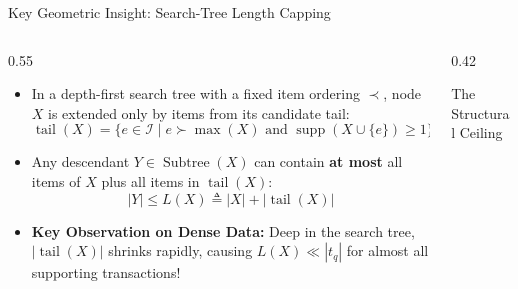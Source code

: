 \documentclass[aspectratio=169,10pt]{beamer}
\newcommand{\supp}{\operatorname{supp}}
\newcommand{\tail}{\operatorname{tail}}
\newcommand{\Subtree}{\operatorname{Subtree}}
\begin{document}
\begin{frame}[fragile]{Key Geometric Insight: Search-Tree Length Capping}
  \begin{columns}[T]
    \begin{column}{0.55\textwidth}
      \begin{itemize}
        \item In a depth-first search tree with a fixed item ordering $\prec$, node $X$ is extended only by items from its candidate tail:
        $$\tail(X) = \{e \in \mathcal{I} \mid e \succ \max(X) \text{ and } \supp(X \cup \{e\}) \ge 1\}$$
        \item Any descendant $Y \in \Subtree(X)$ can contain \textbf{at most} all items of $X$ plus all items in $\tail(X)$:
        $$|Y| \le L(X) \triangleq |X| + |\tail(X)|$$
        \item \textbf{Key Observation on Dense Data:}
        Deep in the search tree, $|\tail(X)|$ shrinks rapidly, causing $L(X) \ll |t_q|$ for almost all supporting transactions!
      \end{itemize}
    \end{column}
    \begin{column}{0.42\textwidth}
      \begin{block}{The Structural Ceiling}
        \centering
        \vspace{0.2cm}
      \end{block}
      \end{column}
  \end{columns}
\end{frame}
\end{document}
